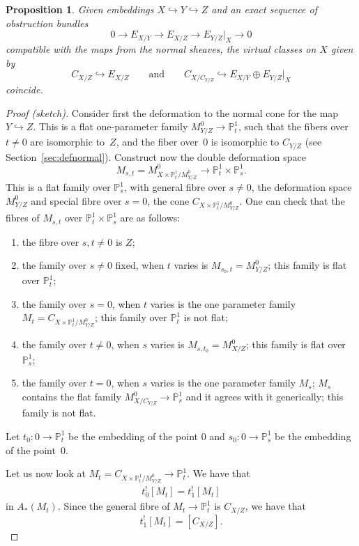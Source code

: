 \documentclass[pdftex]{sigma}
\numberwithin{equation}{section}
\newtheorem{Proposition}[Theorem]{Proposition}
 { \theoremstyle{definition}
\newtheorem{Definition}[Theorem]{Definition}
\newtheorem{Note}[Theorem]{Note}
\newtheorem{Example}[Theorem]{Example}
\newtheorem{Remark}[Theorem]{Remark}
\newtheorem{notation}[Theorem]{Notation}
\newtheorem{construction}[Theorem]{Construction}
}
\newcommand{\PP}{\mathbb P}
\begin{document}
\begin{Proposition}\label{easycompat}
Given embeddings $X\hookrightarrow Y\hookrightarrow Z$ and an exact sequence of obstruction bundles
\[0\to E_{X/Y}\to E_{X/Z}\to E_{Y/Z}\rvert_X\to 0\]
compatible with the maps from the normal sheaves,
the virtual classes on $X$ given by
\[C_{X/Z}\hookrightarrow E_{X/Z}\qquad\text{and}\qquad C_{X/C_{Y/Z}}\hookrightarrow E_{X/Y}\oplus E_{Y/Z}\rvert_X\]
coincide.
\end{Proposition}
\begin{proof}[Proof (sketch)]
Consider first the deformation to the normal cone for the map $Y\hookrightarrow Z$. This is a flat one-parameter family $M^0_{Y/Z}\to\PP_{ t}^1$, such that the fibers over $t\neq 0$ are isomorphic to~$Z$, and the fiber over~$0$ is isomorphic to $C_{Y/Z}$ (see Section~\ref{sec:defnormal}).
Construct now the double deformation space
\[
M_{s,t}=M^0_{{X\times\PP^1_t}/M^0_{Y/Z}}\to \PP^1_t\times \PP^1_s.
\]
This is a flat family over $\PP^1_s$, with general fibre over $s\neq 0$, the deformation space $M^0_{Y/Z}$ and special fibre over $s=0$, the cone $C_{X\times \PP^1_t/M^0_{Y/Z}}$. One can check that the fibres of $M_{s,t}$ over $ \PP^1_t\times \PP^1_s$ are as follows:
\begin{enumerate}\itemsep=0pt
\item[1)] the fibre over $s,t\neq 0$ is $Z$;
\item[2)] the family over $s\neq 0$ fixed, when $t$ varies is $M_{s_0,t}=M^0_{Y/Z}$; this family is flat over $\PP^1_t$;
\item[3)] the family over $s=0$, when $t$ varies is the one parameter family $M_{t}=C_{X\times \PP^1_t/M^0_{Y/Z}}$; this family over $\PP^1_t$ is not flat;
\item[4)] the family over $t\neq 0$, when $s$ varies is $M_{s,t_0}=M^0_{X/Z}$; this family is flat over $\PP^1_s$;
\item[5)] the family over $t=0$, when $s$ varies is the one parameter family $M_{s}$; $M_s$ contains the flat family $M^0_{X/C_{Y/Z}}\to \PP^1_s$ and it agrees with it generically; this family is not flat.
\end{enumerate}
Let $t_0\colon 0\to \PP^1_t$ be the embedding of the point $0$ and $s_0\colon 0\to \PP^1_s$ be the embedding of the point~$0$.

Let us now look at $M_t=C_{X\times \PP^1_t/M^0_{Y/Z}}\to \PP^1_t$. We have that
\begin{gather*}t_0^![M_t]=t_1^![M_t]
\end{gather*}
in $A_*(M_t)$. Since the general fibre of $M_t\to\PP^1_t$ is $C_{X/Z}$, we have that
\begin{equation*}%
t^!_1[M_t]=[C_{X/Z}].
\end{equation*}


\end{proof}
\end{document}
